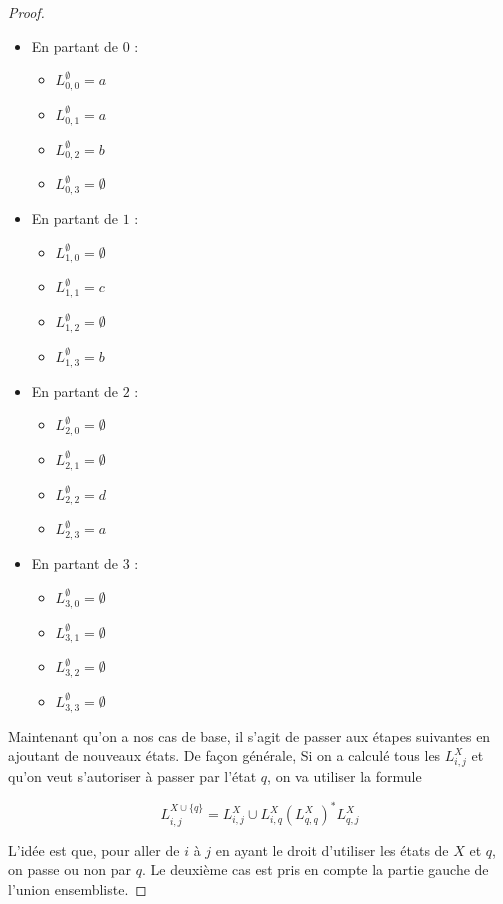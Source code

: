 \begin{proof}
\begin{itemize}
\item En partant de $0$ :
   \begin{itemize}
	 \item $L_{0,0}^{\emptyset} = a$
	 \item $L_{0,1}^{\emptyset} = a$
	 \item $L_{0,2}^{\emptyset} = b$
	 \item $L_{0,3}^{\emptyset} = \emptyset$
   \end{itemize}
\item En partant de $1$ :
   \begin{itemize}
	 \item $L_{1,0}^{\emptyset} = \emptyset$
	 \item $L_{1,1}^{\emptyset} = c$
	 \item $L_{1,2}^{\emptyset} = \emptyset$
	 \item $L_{1,3}^{\emptyset} = b$
   \end{itemize}
\item En partant de $2$ :
   \begin{itemize}
	 \item $L_{2,0}^{\emptyset} = \emptyset$
	 \item $L_{2,1}^{\emptyset} = \emptyset$
	 \item $L_{2,2}^{\emptyset} = d$
	 \item $L_{2,3}^{\emptyset} = a$
   \end{itemize}
\item En partant de $3$ :
   \begin{itemize}
	 \item $L_{3,0}^{\emptyset} = \emptyset$
	 \item $L_{3,1}^{\emptyset} = \emptyset$
	 \item $L_{3,2}^{\emptyset} = \emptyset$
	 \item $L_{3,3}^{\emptyset} = \emptyset$
   \end{itemize}
\end{itemize}

Maintenant qu'on a nos cas de base, il s'agit de passer aux étapes suivantes en ajoutant de nouveaux états. De façon générale, Si on a calculé tous les $L_{i,j}^X$ et qu'on veut s'autoriser à passer par l'état $q$, on va utiliser la formule 

\[
L_{i,j}^{X \cup \{q\}} = L_{i,j}^X \cup L_{i,q}^X(L_{q,q}^X)^*L_{q,j}^X
\]

L'idée est que, pour aller de $i$ à $j$ en ayant le droit d'utiliser les états de $X$ et $q$, on passe ou non par $q$. Le deuxième cas est pris en compte la partie gauche de l'union ensembliste.


\end{proof}
